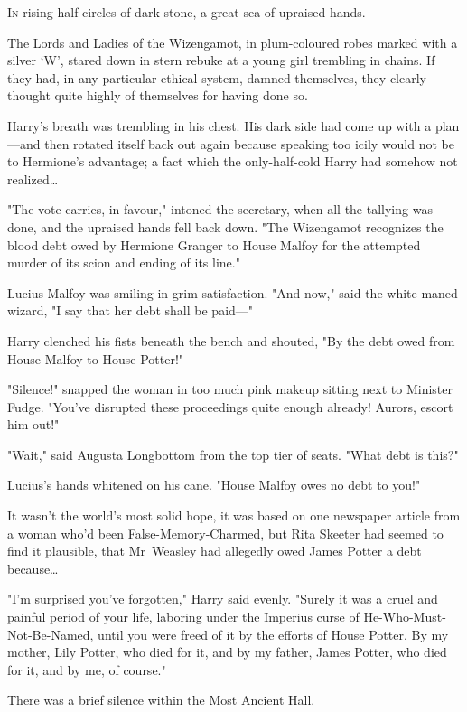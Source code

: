 
\lettrine{I}{n} rising
half-circles of dark stone, a great sea of upraised hands.

\quad\quad
The Lords and Ladies of the Wizengamot, in plum-coloured robes marked with a
silver `W', stared down in stern rebuke at a young girl trembling in chains. If
they had, in any particular ethical system, damned themselves, they clearly
thought quite highly of themselves for having done so.

Harry's breath was trembling in his chest. His dark side had come up with a
plan—and then rotated itself back out again because speaking too icily would
not be to Hermione's advantage; a fact which the only-half-cold Harry had
somehow not realized…

"The vote carries, in favour," intoned the secretary, when all the tallying was
done, and the upraised hands fell back down. "The Wizengamot recognizes the
blood debt owed by Hermione Granger to House Malfoy for the attempted murder of
its scion and ending of its line."

Lucius Malfoy was smiling in grim satisfaction. "And now," said the white-maned
wizard, "I say that her debt shall be paid—"

Harry clenched his fists beneath the bench and shouted, "By the debt owed from
House Malfoy to House Potter!"

"Silence!" snapped the woman in too much pink makeup sitting next to Minister
Fudge. "You've disrupted these proceedings quite enough already! Aurors, escort
him out!"

"Wait," said Augusta Longbottom from the top tier of seats. "What debt is this?"

Lucius's hands whitened on his cane. "House Malfoy owes no debt to you!"

It wasn't the world's most solid hope, it was based on one newspaper article
from a woman who'd been False-Memory-Charmed, but Rita Skeeter had seemed to
find it plausible, that Mr~Weasley had allegedly owed James Potter a debt
because…

"I'm surprised you've forgotten," Harry said evenly. "Surely it was a cruel and
painful period of your life, laboring under the Imperius curse of
He-Who-Must-Not-Be-Named, until you were freed of it by the efforts of House
Potter. By my mother, Lily Potter, who died for it, and by my father, James
Potter, who died for it, and by me, of course."

There was a brief silence within the Most Ancient Hall.

